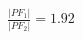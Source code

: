\documentclass[preview]{standalone}
\begin{document}
\begin{align*}
\frac{|PF_1|}{|PF_2|} = 1.92
\end{align*}
\end{document}
